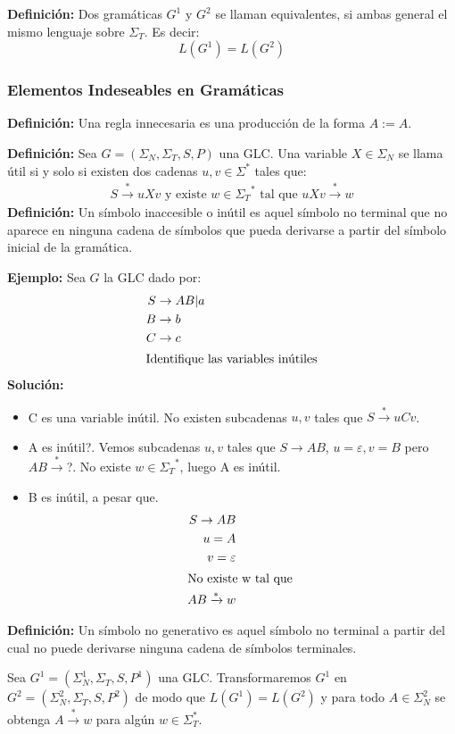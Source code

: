 \textbf{Definición: }Dos gramáticas $G^1$ y $G^2$ se llaman equivalentes, si ambas general el mismo lenguaje sobre $\Sigma_T$. Es decir:
$$L(G^1)=L(G^2)$$
\subsubsection{Elementos Indeseables en Gramáticas}
\textbf{Definición: }Una regla innecesaria es una producción de la forma $A:=A$.

\textbf{Definición: }Sea $G=(\Sigma_N,\Sigma_T,S,P)$ una GLC. Una variable $X\in \Sigma_N$ se llama útil si y solo si existen dos cadenas $u,v\in\Sigma^*$ tales que:
\begin{align*}
S	\xrightarrow{*} uXv \mbox{ y existe } w\in{\Sigma_T}^* \mbox{ tal que } uXv\xrightarrow{*}w
\end{align*}
\textbf{Definición: }Un símbolo inaccesible o inútil es aquel símbolo no terminal que no aparece en ninguna cadena de símbolos que pueda derivarse a partir del símbolo inicial de la gramática.

\textbf{Ejemplo: }Sea $G$ la GLC dado por:
\begin{align*}
S	&\rightarrow AB|a	\\
B	&\rightarrow b	\\
C	&\rightarrow c	\\
\intertext{Identifique las variables inútiles}
\end{align*}
\textbf{Solución: }
\begin{itemize}
\item C es una variable inútil. No existen subcadenas $u,v$ tales que $S\xrightarrow{*}uCv$.
\item A es inútil?. Vemos subcadenas $u,v$ tales que $S\rightarrow AB$, $u=\varepsilon,v=B$ pero $AB\xrightarrow{*}$?. No existe $w\in{\Sigma_T}^*$, luego A es inútil.
\item B es inútil, a pesar que.
\begin{align*}
S\rightarrow AB	\\
u=A	\\
v=\varepsilon\\
\intertext{No existe w tal que }
AB\xrightarrow{*} w
\end{align*}
\end{itemize}

\textbf{Definición: }Un símbolo no generativo es aquel símbolo no terminal a partir del cual no puede derivarse ninguna cadena de símbolos terminales.

Sea $G^1 =(\Sigma_N^1, \Sigma_T, S, P^1)$ una GLC. Transformaremos $G^1$ en $G^2=(\Sigma_N^2, \Sigma_T, S, P^2)$ de modo que $L(G^1)=L(G^2)$ y para todo $A\in\Sigma_N^2$ se obtenga $A\xrightarrow{*}w$ para algún $w\in\Sigma_T^*$.

